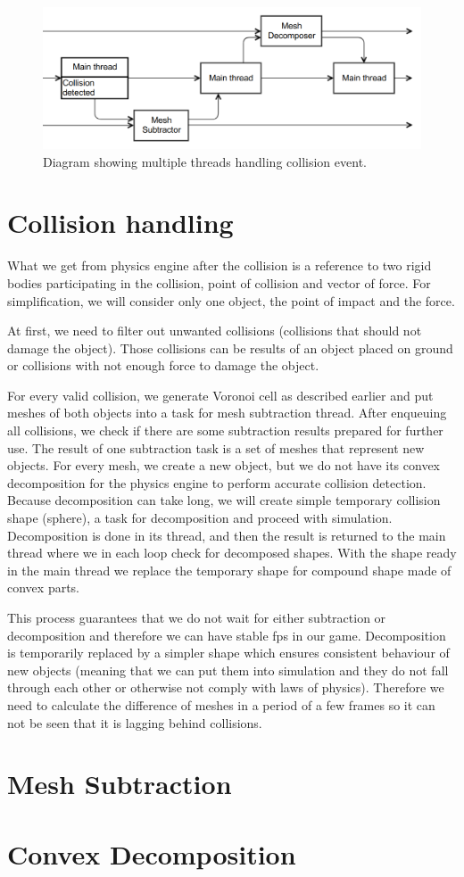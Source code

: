 \begin{figure}
        \centering
        \includegraphics[width=\textwidth]{img/decompositionFlow}
        \caption{Diagram showing multiple threads handling collision event. }
        \label{fig:threads}
\end{figure}



\section{Collision handling}
\label{sec:collisions}
What we get from physics engine after the collision is a reference to two rigid bodies participating in the collision, point of collision and vector of force. For simplification, we will consider only one object, the point of impact and the force.

At first, we need to filter out unwanted collisions (collisions that should not damage the object). Those collisions can be results of an object placed on ground or collisions with not enough force to damage the object. 

For every valid collision, we generate Voronoi cell as described earlier and put meshes of both objects into a task for mesh subtraction thread. After enqueuing all collisions, we check if there are some subtraction results prepared for further use. The result of one subtraction task is a set of meshes that represent new objects. For every mesh, we create a new object, but we do not have its convex decomposition for the physics engine to perform accurate collision detection. Because decomposition can take long, we will create simple temporary collision shape (\eg sphere), a task for decomposition and proceed with simulation. Decomposition is done in its thread, and then the result is returned to the main thread where we in each loop check for decomposed shapes. With the shape ready in the main thread we replace the temporary shape for compound shape made of convex parts.

This process guarantees that we do not wait for either subtraction or decomposition and therefore we can have stable fps in our game. Decomposition is temporarily replaced by a simpler shape which ensures consistent behaviour of new objects (meaning that we can put them into simulation and they do not fall through each other or otherwise not comply with laws of physics). Therefore we need to calculate the difference of meshes in a period of a few frames so it can not be seen that it is lagging behind collisions.


\section{Mesh Subtraction}
\label{sec:subtraction}

\section{Convex Decomposition}
\label{sec:decomposition}



